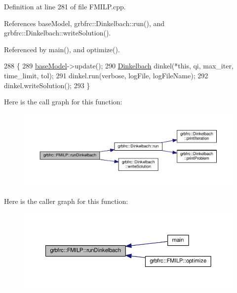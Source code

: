 Definition at line 281 of file F\+M\+I\+L\+P.\+cpp.



References base\+Model, grbfrc\+::\+Dinkelbach\+::run(), and grbfrc\+::\+Dinkelbach\+::write\+Solution().



Referenced by main(), and optimize().


\begin{DoxyCode}
288  \{
289   \hyperlink{classgrbfrc_1_1FMILP_a587e886dcaa1ece325a7f283100182a8}{baseModel}->update();
290   \hyperlink{classgrbfrc_1_1FMILP_a84e1163273507597523f840b89817919}{Dinkelbach} dinkel(*\textcolor{keyword}{this}, qi, max\_iter, time\_limit, tol);
291   dinkel.run(verbose, logFile, logFileName);
292   dinkel.writeSolution();
293  \}
\end{DoxyCode}


Here is the call graph for this function\+:
\nopagebreak
\begin{figure}[H]
\begin{center}
\leavevmode
\includegraphics[width=350pt]{classgrbfrc_1_1FMILP_a4a5ba754ac4e88ec64cd739ed82d5134_cgraph}
\end{center}
\end{figure}




Here is the caller graph for this function\+:
\nopagebreak
\begin{figure}[H]
\begin{center}
\leavevmode
\includegraphics[width=350pt]{classgrbfrc_1_1FMILP_a4a5ba754ac4e88ec64cd739ed82d5134_icgraph}
\end{center}
\end{figure}


